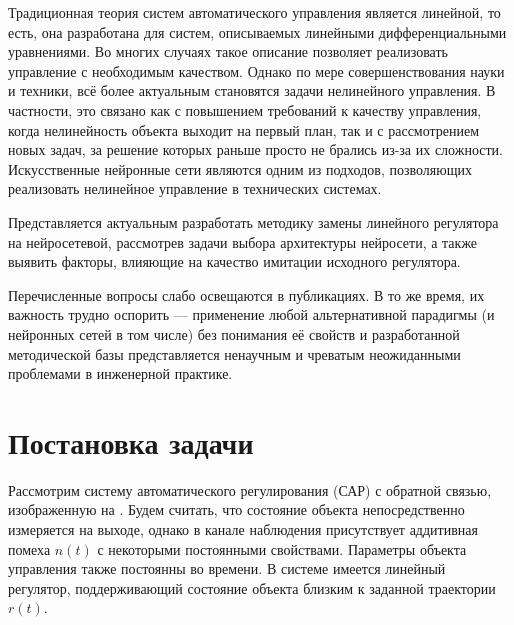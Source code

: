 
Традиционная \label{nnc_pre} теория систем автоматического управления
является линейной, то есть, она разработана для систем, описываемых
линейными дифференциальными уравнениями.  Во многих случаях такое
описание позволяет реализовать управление с необходимым качеством.
Однако по мере совершенствования науки и техники, всё более актуальным
становятся задачи нелинейного управления.  В частности, это связано
как с повышением требований к качеству управления, когда нелинейность
объекта выходит на первый план, так и с рассмотрением новых задач, за
решение которых раньше просто не брались из-за их сложности.
Искусственные нейронные сети являются одним из подходов, позволяющих
реализовать нелинейное управление в технических системах.


Представляется актуальным разработать методику замены линейного
регулятора на нейросетевой, рассмотрев задачи выбора архитектуры
нейросети, а также выявить факторы, влияющие на качество имитации
исходного регулятора.


Перечисленные вопросы слабо освещаются в публикациях.  В то же время,
их важность трудно оспорить --- применение любой альтернативной
парадигмы (и нейронных сетей в том числе) без понимания её свойств и
разработанной методической базы представляется ненаучным и чреватым
неожиданными проблемами в инженерной практике.

\section{Постановка задачи}

Рассмотрим систему автоматического регулирования (САР) с обратной
связью, изображенную на .  Будем считать, что
состояние объекта непосредственно измеряется на выходе, однако в
канале наблюдения присутствует аддитивная помеха $n(t)$ с некоторыми
постоянными свойствами.  Параметры объекта управления также постоянны
во времени.  В системе имеется линейный регулятор, поддерживающий
состояние объекта близким к заданной траектории $r(t)$.

